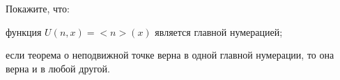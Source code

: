 Покажите, что:
\begin{enumcyr}
    \item функция $U(n,x) = {<}n{>}(x)$ является главной нумерацией;
    \item если теорема о неподвижной точке верна в одной главной нумерации, то она верна и в любой другой.
\end{enumcyr}